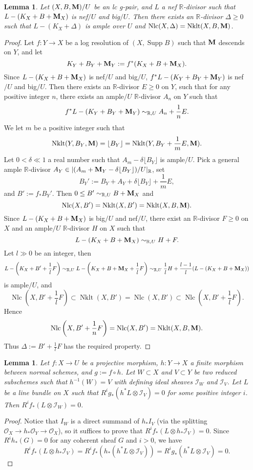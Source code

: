 \documentclass[11pt]{amsart}
\numberwithin{equation}{section}
\newcommand{\Mm}{{\bf{M}}}
\newcommand{\Rr}{\mathbb{R}}
\newcommand{\Nklt}{\operatorname{Nklt}}
\newcommand{\Supp}{\operatorname{Supp}}
\newcommand{\Nlc}{\operatorname{Nlc}}
\newcommand{\Oo}{\mathcal{O}}
\newtheorem{lem}[thm]{Lemma}
\theoremstyle{definition}
\theoremstyle{definition}
\theoremstyle{definition}
\begin{document}
\begin{lem}\label{lem: perturb glc pair to nlc pair}
Let $(X,B,\Mm)/U$ be an lc g-pair, and $L$ a nef $\Rr$-divisor such that $L-(K_X+B+\Mm_X)$ is nef$/U$ and big$/U$. Then there exists an $\Rr$-divisor $\Delta\geq 0$ such that $L-(K_X+\Delta)$ is ample over $U$ and $\Nlc(X,\Delta)=\Nklt(X,B,\Mm)$. 
\end{lem}
\begin{proof}
Let $f: Y\to X$ be a log resolution of $(X,\Supp B)$ such that $\Mm$ descends on $Y$, and let
$$K_Y+B_Y+\Mm_Y:=f^*(K_X+B+\Mm_X).$$
Since $L-(K_X+B+\Mm_X)$ is nef$/U$ and big$/U$, $f^*L-(K_Y+B_Y+\Mm_Y)$ is nef$/U$ and big$/U$. Then there exists an $\Rr$-divisor $E\geq 0$ on $Y$, such that for any positive integer $n$, there exists an ample$/U$ $\Rr$-divisor $A_n$ on $Y$ such that
$$f^*L-(K_Y+B_Y+\Mm_Y)\sim_{\Rr,U} A_n+\frac{1}{n}E.$$
We let $m$ be a positive integer such that
$$\Nklt(Y,B_Y,\Mm)=\lfloor B_Y\rfloor=\Nklt(Y,B_Y+\frac{1}{m}E,\Mm).$$
Let $0<\delta\ll 1$ a real number such that $A_m-\delta\lfloor B_Y\rfloor$ is ample$/U$. Pick a general ample $\Rr$-divisor $A_Y\in|(A_{m}+\Mm_Y-\delta\lfloor B_Y\rfloor)/U|_{\mathbb R}$, set
$$B_Y':=B_Y+A_Y+\delta\lfloor B_Y\rfloor+\frac{1}{m}E,$$
and $B':=f_*B_Y'$. Then $0\leq B'\sim_{\mathbb R,U}B+\Mm_X$ and
$$\Nlc(X,B')=\Nklt(X,B')=\Nklt(X,B,\Mm).$$
Since $L-(K_X+B+\Mm_X)$ is big$/U$ and nef$/U$, there exist an $\Rr$-divisor $F\geq 0$ on $X$ and an ample$/U$ $\Rr$-divisor $H$ on $X$ such that
$$L-(K_X+B+\Mm_X)\sim_{\mathbb R,U}H+F.$$
Let $l\gg 0$ be an integer, then
$$L-\left(K_X+B'+\frac{1}{l}F\right)\sim_{\mathbb R,U}L-\left(K_X+B+\Mm_X+\frac{1}{l}F\right)\sim_{\mathbb R,U}\frac{1}{l}H+\frac{l-1}{l}(L-(K_X+B+\Mm_X))$$
is ample$/U$, and
$$\Nlc\left(X,B'+\frac{1}{l}F\right)\subset\Nklt(X,B')=\Nlc(X,B')\subset\Nlc\left(X,B'+\frac{1}{l}F\right).$$
Hence
$$\Nlc\left(X,B'+\frac{1}{n}F\right)=\Nlc(X,B')=\Nklt(X,B,\Mm).$$
Thus $\Delta:=B'+\frac{1}{l}F$ has the required property.
\end{proof}

\begin{lem}\label{lem: vanishing keep under finite mor}
    Let  $f: X\rightarrow U$ be a projective morphism, $h: Y\rightarrow X$ a finite morphism between normal schemes, and $g:=f\circ h$. Let $W\subset X$ and $V\subset Y$ be two reduced subschemes such that $h^{-1}(W)=V$ with defining ideal sheaves $\mathcal{I}_W$ and $\mathcal{I}_V$. Let $L$ be a line bundle on $X$ such that $R^ig_*(h^*L\otimes\mathcal{I}_V)=0$ for some positive integer $i$. Then $R^if_*(L\otimes\mathcal{I}_W)=0$.
\end{lem}
\begin{proof}
    Notice that $I_W$ is a direct summand of $h_*I_V$ (via the splitting $\Oo_X\to h_*\Oo_Y\to \Oo_X$), so it suffices to prove that $R^if_*(L\otimes h_*\mathcal{I}_V)=0$.
    Since $R^ih_*(G)=0$ for any coherent sheaf $G$ and $i>0$, we have
    $$R^if_*(L\otimes h_*\mathcal{I}_V)=R^if_*(h_*(h^*L\otimes\mathcal{I}_V))=R^ig_*(h^*L\otimes\mathcal{I}_V)=0.$$
\end{proof}
\end{document}
